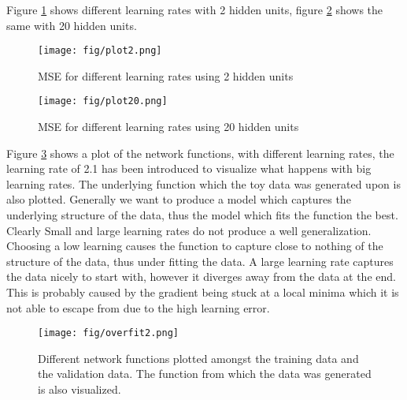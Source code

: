 \documentclass{article}
\begin{document}
Figure \ref{fig:mulplots} shows different learning rates with 2 hidden units, figure \ref{fig:mulplots1} shows the same with 20 hidden units.
\begin{figure}[H]
  \centering
  \texttt{[image: fig/plot2.png]}
  \caption{MSE for different learning rates using 2 hidden units}
  \label{fig:mulplots}
\end{figure}
\begin{figure}[H]
  \centering
  \texttt{[image: fig/plot20.png]}
  \caption{MSE for different learning rates using 20 hidden units}
  \label{fig:mulplots1}
\end{figure}
Figure \ref{fig:overfit} shows a plot of the network functions, with different learning rates, the learning rate of 2.1 has been introduced to visualize what happens with big learning rates. The underlying function which the toy data was generated upon is also plotted. Generally we want to produce a model which captures the underlying structure of the data, thus the model which fits the function the best. Clearly Small and large learning rates do not produce a well generalization. Choosing a low learning causes the function to capture close to nothing of the structure of the data, thus under fitting the data. A large learning rate captures the data nicely to start with, however it diverges away from the data at the end. This is probably caused by the gradient being stuck at a local minima which it is not able to escape from due to the high learning error.
\begin{figure}[H]
  \centering
  \texttt{[image: fig/overfit2.png]}
  \caption{Different network functions plotted amongst the training data and the validation data. The function from which the data was generated is also visualized.}
  \label{fig:overfit}
\end{figure}
\end{document}
